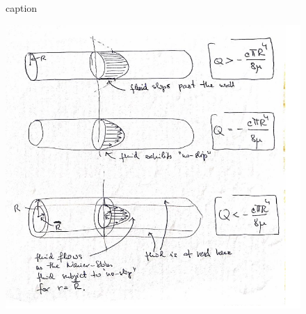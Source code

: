 \documentclass{article}
\begin{document}

\begin{figure}
\caption{caption}
\end{figure}



\begin{figure}
    \centering
\includegraphics{Screenshot 2023-08-24 141914.png}
\end{figure}
\end{document}
